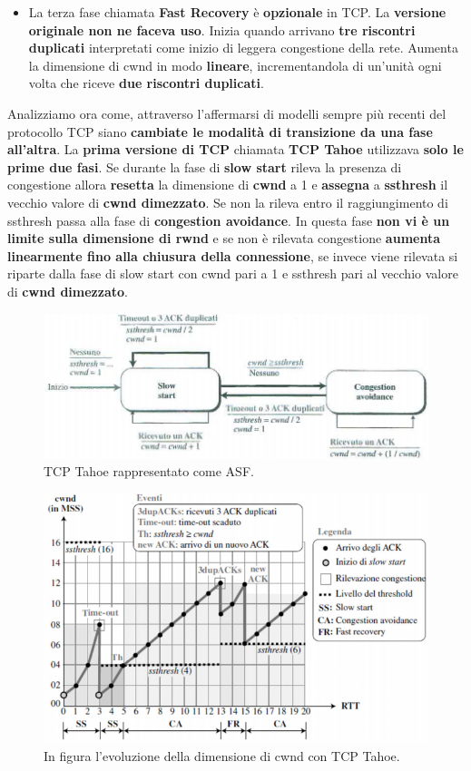 \documentclass[11pt,a4paper,oneside]{book}
\theoremstyle{definition}
\begin{document}
\begin{itemize}
	      \pagebreak

	\item La terza fase chiamata \textbf{Fast Recovery} è \textbf{opzionale} in TCP. La \textbf{versione originale non ne faceva uso}. Inizia quando arrivano \textbf{tre riscontri duplicati} interpretati come inizio di leggera congestione della rete. Aumenta la dimensione di cwnd in modo \textbf{lineare}, incrementandola di un'unità ogni volta che riceve \textbf{due riscontri duplicati}.
\end{itemize}
Analizziamo ora come, attraverso l'affermarsi di modelli sempre più recenti del protocollo TCP siano \textbf{cambiate le modalità di transizione da una fase all'altra}.
La \textbf{prima versione di TCP} chiamata \textbf{TCP Tahoe} utilizzava \textbf{solo le prime due fasi}. Se durante la fase di \textbf{slow start} rileva la presenza di congestione allora \textbf{resetta} la dimensione di \textbf{cwnd} a 1 e \textbf{assegna} a \textbf{ssthresh} il vecchio valore di \textbf{cwnd dimezzato}. Se non la rileva entro il raggiungimento di ssthresh passa alla fase di \textbf{congestion avoidance}.
In questa fase \textbf{non vi è un limite sulla dimensione di rwnd} e se non è rilevata congestione \textbf{aumenta linearmente fino alla chiusura della connessione}, se invece viene rilevata si riparte dalla fase di slow start con cwnd pari a 1 e ssthresh pari al vecchio valore di \textbf{cwnd dimezzato}.
\begin{figure}[!h]
	\includegraphics[scale=0.33]{Immagini/Taho.png}
	\centering
	\caption{TCP Tahoe rappresentato come ASF.}
\end{figure}
\begin{figure}[!h]
	\includegraphics[scale=0.23]{Immagini/Taho2.png}
	\centering
	\caption{In figura l'evoluzione della dimensione di cwnd con TCP Tahoe.}
\end{figure}
\end{document}
